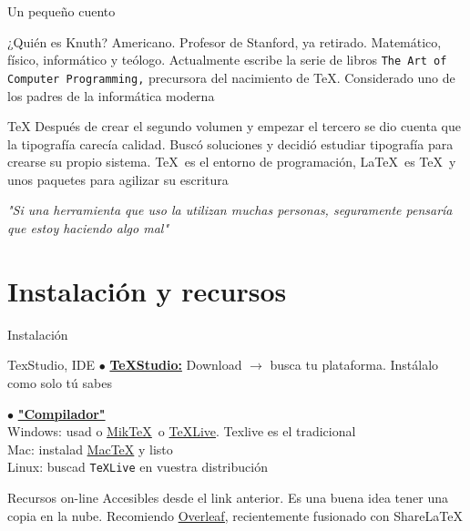 \documentclass[12pt]{beamer}
\begin{document}
\begin{frame}{Un pequeño cuento}
\small
\begin{block}{¿Quién es Knuth?}
	Americano. Profesor de Stanford, ya retirado. Matemático, físico, informático y teólogo. Actualmente escribe la serie de libros \texttt{The Art of Computer Programming,} precursora del nacimiento de \TeX. Considerado uno de los padres de la informática moderna
\end{block}

\begin{block}{\TeX}
	Después de crear el segundo volumen y empezar el tercero se dio cuenta que la tipografía carecía calidad. Buscó soluciones y decidió estudiar tipografía para crearse su propio sistema. \TeX\ es el entorno de programación, \LaTeX\ es \TeX\ y unos paquetes para agilizar su escritura
\end{block}

	\textit{"Si una herramienta que uso la utilizan muchas personas, seguramente pensaría que estoy haciendo algo mal"}

\end{frame}

\section{Instalación y recursos}

\begin{frame}{Instalación}

\begin{block}{TexStudio, IDE}
	$\bullet$ \href{http://www.texstudio.org/}{\textbf{\TeX Studio:}} Download $\rightarrow$ busca tu plataforma. Instálalo como solo tú sabes
\end{block}

\begin{block}{\LaTeXe}
	$\bullet$ \href{https://www.latex-project.org/get/}{\textbf{"Compilador"}} \\
	Windows: usad o \href{https://miktex.org/}{Mik\TeX}\ o \href{https://tug.org/texlive/acquire-netinstall.html}{\TeX Live}. Texlive es el tradicional\\
	Mac: instalad \href{https://www.tug.org/mactex/}{Mac\TeX} y listo \\
	Linux: buscad \texttt{\TeX Live} en vuestra distribución
\end{block}
\begin{block}{Recursos on-line}
	Accesibles desde el link anterior. Es una buena idea tener una copia en la nube. Recomiendo \href{https://www.overleaf.com/}{Overleaf,} recientemente fusionado con Share\LaTeX
\end{block}
\end{frame}
\end{document}
